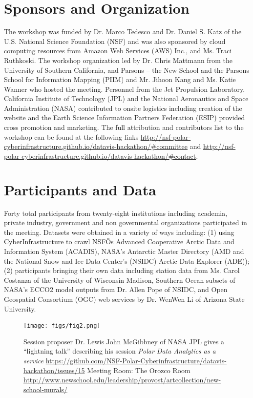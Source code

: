 \documentclass[11pt]{article}
\begin{document}
\section{Sponsors and Organization}
The workshop was funded by Dr. Marco Tedesco and Dr. Daniel S. Katz of the U.S. National Science Foundation (NSF) and was also sponsored by cloud computing resources from Amazon Web Services (AWS) Inc., and Ms. Traci Ruthkoski. The workshop organization led by Dr. Chris Mattmann from the University of Southern California, and Parsons -- the New School and the Parsons School for Information Mapping (PIIM) and Mr. Jihoon Kang and Ms. Katie Wanner who hosted the meeting. Personnel from the Jet Propulsion Laboratory, California Institute of Technology (JPL) and the National Aeronautics and Space Administration (NASA) contributed to onsite logistics including creation of the website and the Earth Science Information Partners Federation (ESIP) provided cross promotion and marketing. The full attribution and contributors list to the workshop can be found at the following links \url{http://nsf-polar-cyberinfrastructure.github.io/datavis-hackathon/#committee} and \url{http://nsf-polar-cyberinfrastructure.github.io/datavis-hackathon/#contact}. 


\section{Participants and Data}
Forty total participants from twenty-eight institutions including academia, private industry, government and non governmental organizations participated in the meeting. Datasets were obtained in a variety of ways including: (1) using CyberInfrastructure to crawl NSFÕs Advanced Cooperative Arctic Data and Information System (ACADIS), NASA's Antarctic Master Directory (AMD and the National Snow and Ice Data Center's (NSIDC) Arctic Data Explorer (ADE));  (2) participants bringing their own data including station data from Ms. Carol Costanza of the University of Wisconsin Madison, Southern Ocean subsets of NASA's ECCO2 model outputs from Dr. Allen Pope of NSIDC, and Open Geospatial Consortium (OGC) web services by Dr. WenWen Li of Arizona State University. 

\begin{figure}[htp]
    \centering
    \texttt{[image: figs/fig2.png]}
    \caption{Session proposer Dr. Lewis John McGibbney of NASA JPL gives a ``lightning talk'' describing his session {\em Polar Data Analytics as a service} \protect\url{https://github.com/NSF-Polar-Cyberinfrastructure/datavis-hackathon/issues/15} Meeting Room: The Orozco Room \protect\url{http://www.newschool.edu/leadership/provost/artcollection/new-school-murals/}}
    \label{fig:lightning}
\end{figure}
\end{document}
